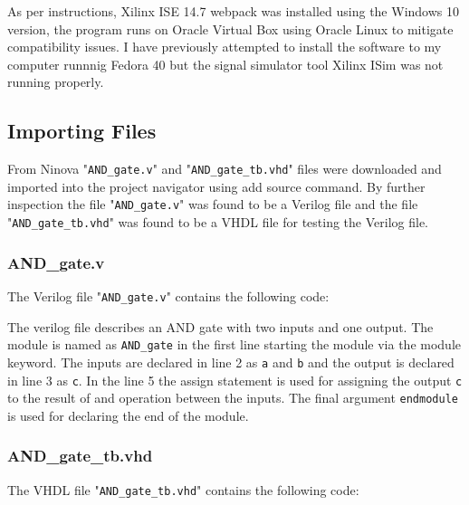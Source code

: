 \documentclass{article}
\begin{document}
As per instructions, Xilinx ISE 14.7 webpack was installed using the Windows 10 version, the program runs on Oracle Virtual Box using Oracle Linux to mitigate compatibility issues. I have previously attempted to install the software to my computer runnnig Fedora 40 but the signal simulator tool Xilinx ISim was not running properly. 

\subsection*{Importing Files}

From Ninova "\verb|AND_gate.v|" and "\verb|AND_gate_tb.vhd|" files were downloaded and imported into the project navigator using add source command. 
By further inspection the file "\verb|AND_gate.v|" was found to be a Verilog file and the file "\verb|AND_gate_tb.vhd|" was found to be a VHDL file for testing the Verilog file.

\subsubsection*{AND\_gate.v}

The Verilog file "\verb|AND_gate.v|" contains the following code:

\begin{center} %
    \lstset{
  caption= AND\_gate.v, 
  basicstyle=\footnotesize, frame=tb,
  xleftmargin=.2\textwidth, xrightmargin=.2\textwidth
}
    

    \end{center}

The verilog file describes an AND gate with two inputs and one output. The module is named as \verb|AND_gate| in the first line starting the module via the module keyword. The inputs are declared in line 2 as \verb|a| and \verb|b| and the output is declared in line 3 as \verb|c|. In the line 5 the assign statement is used for assigning the output \verb|c| to the result of and operation between the inputs. The final argument \verb|endmodule| is used for declaring the end of the module.


\subsubsection*{AND\_gate\_tb.vhd}

The VHDL file "\verb|AND_gate_tb.vhd|" contains the following code:
\end{document}
